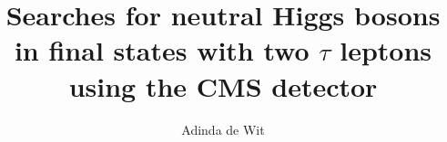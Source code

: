 \documentclass[hyperpdf,bindnopdf]{hepthesis}
\title{Searches for neutral Higgs bosons in final states with two $\tau$ leptons using the CMS detector}
\author{Adinda de Wit}
\begin{document}
\begin{frontmatter}
  
\end{frontmatter}

\begin{mainmatter}
  
  
  
  
\end{mainmatter}

%  

\begin{backmatter}
  
\end{backmatter}

\end{document}
